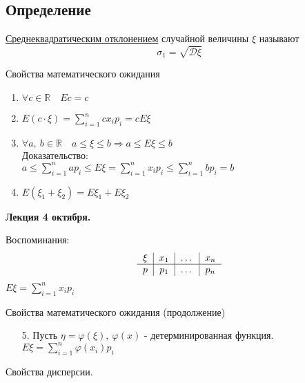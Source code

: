 \documentclass[12pt, a4paper]{article}
\begin{document}
    \subsection*{Определение}
    \underline{Среднеквадратическим отклонением} случайной величины $\xi$ называют
    \[\sigma_1 = \sqrt{\mathcal{D}\xi}\]
    \begin{center}
        Свойства математического ожидания
    \end{center}
    \begin{enumerate}
        \item $\forall c\in \mathbb{R}\quad Ec = c$
        \item $E(c\cdot \xi) =\displaystyle \sum_{i = 1}^{n} cx_i p_i = cE\xi$
        \item $\forall a,\ b\in \mathbb{R}\quad a \leq \xi \leq b\Rightarrow a \leq E\xi \leq b$\\
        Доказательство:\\
        $\displaystyle a \leq \sum_{i = 1}^{n} ap_i \leq E\xi = \sum_{i = 1}^{n} x_i p_i \leq \sum_{i = 1}^{n} b p_i = b$
        \item $E(\xi_1 + \xi_2) = E\xi_1 + E\xi_2$
    \end{enumerate}
    \begin{center}
        \bf Лекция 4 октября.
    \end{center}
    Воспоминания:
    \[\begin{tabular}{c|c|c|c}
        $\xi$ & $x_1$ & $\dots$ & $x_n$\\
        \hline
        $p$ & $p_1$ & $\dots$ & $p_n$
     \end{tabular}\]
     $E\xi = \displaystyle \sum\limits_{i = 1}^{n} x_i p_i$
     \begin{center}
        Свойства математического ожидания (продолжение)
     \end{center}
     \begin{enumerate}
        \item[5.] Пусть $\eta = \varphi(\xi),\ \varphi(x)$ - детерминированная функция.\\
        $E\xi = \displaystyle\sum\limits_{i = 1}^{n} \varphi(x_i) p_i$
     \end{enumerate}
     \begin{center}
        Свойства дисперсии.
     \end{center}
\end{document}
